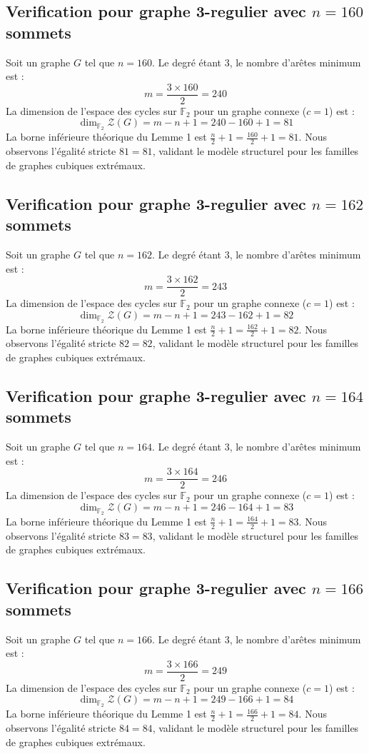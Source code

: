\documentclass[11pt,a4paper]{article}
\begin{document}
\subsection{Verification pour graphe 3-regulier avec $n=160$ sommets}
Soit un graphe $G$ tel que $n = 160$. Le degré étant 3, le nombre d'arêtes minimum est :
$$ m = \frac{3 \times 160}{2} = 240 $$
La dimension de l'espace des cycles sur $\mathbb{F}_2$ pour un graphe connexe ($c=1$) est :
$$ \dim_{\mathbb{F}_2} \mathcal{Z}(G) = m - n + 1 = 240 - 160 + 1 = 81 $$
La borne inférieure théorique du Lemme 1 est $\frac{n}{2} + 1 = \frac{160}{2} + 1 = 81$.
Nous observons l'égalité stricte $81 = 81$, validant le modèle structurel pour les familles de graphes cubiques extrémaux.

\subsection{Verification pour graphe 3-regulier avec $n=162$ sommets}
Soit un graphe $G$ tel que $n = 162$. Le degré étant 3, le nombre d'arêtes minimum est :
$$ m = \frac{3 \times 162}{2} = 243 $$
La dimension de l'espace des cycles sur $\mathbb{F}_2$ pour un graphe connexe ($c=1$) est :
$$ \dim_{\mathbb{F}_2} \mathcal{Z}(G) = m - n + 1 = 243 - 162 + 1 = 82 $$
La borne inférieure théorique du Lemme 1 est $\frac{n}{2} + 1 = \frac{162}{2} + 1 = 82$.
Nous observons l'égalité stricte $82 = 82$, validant le modèle structurel pour les familles de graphes cubiques extrémaux.

\subsection{Verification pour graphe 3-regulier avec $n=164$ sommets}
Soit un graphe $G$ tel que $n = 164$. Le degré étant 3, le nombre d'arêtes minimum est :
$$ m = \frac{3 \times 164}{2} = 246 $$
La dimension de l'espace des cycles sur $\mathbb{F}_2$ pour un graphe connexe ($c=1$) est :
$$ \dim_{\mathbb{F}_2} \mathcal{Z}(G) = m - n + 1 = 246 - 164 + 1 = 83 $$
La borne inférieure théorique du Lemme 1 est $\frac{n}{2} + 1 = \frac{164}{2} + 1 = 83$.
Nous observons l'égalité stricte $83 = 83$, validant le modèle structurel pour les familles de graphes cubiques extrémaux.

\subsection{Verification pour graphe 3-regulier avec $n=166$ sommets}
Soit un graphe $G$ tel que $n = 166$. Le degré étant 3, le nombre d'arêtes minimum est :
$$ m = \frac{3 \times 166}{2} = 249 $$
La dimension de l'espace des cycles sur $\mathbb{F}_2$ pour un graphe connexe ($c=1$) est :
$$ \dim_{\mathbb{F}_2} \mathcal{Z}(G) = m - n + 1 = 249 - 166 + 1 = 84 $$
La borne inférieure théorique du Lemme 1 est $\frac{n}{2} + 1 = \frac{166}{2} + 1 = 84$.
Nous observons l'égalité stricte $84 = 84$, validant le modèle structurel pour les familles de graphes cubiques extrémaux.
\end{document}
